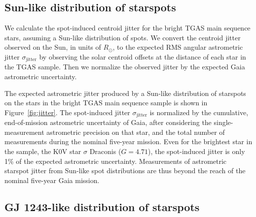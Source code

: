 \subsection{Sun-like distribution of starspots} \label{sec:sunspot_jitter}

We calculate the spot-induced centroid jitter for the bright TGAS main sequence stars, assuming a Sun-like distribution of spots. We convert the centroid jitter observed on the Sun, in units of $R_\odot$, to the expected RMS angular astrometric jitter $\sigma_{\mathrm{jitter}}$ by observing the solar centroid offsets at the distance of each star in the TGAS sample. Then we normalize the observed jitter by the expected Gaia astrometric uncertainty. 

The expected astrometric jitter produced by a Sun-like distribution of starspots on the stars in the bright TGAS main sequence sample is shown in Figure~\ref{fig:jitter}. The spot-induced jitter $\sigma_{\mathrm{jitter}}$ is normalized by the cumulative, end-of-mission astrometric uncertainty of Gaia, after considering the single-measurement astrometric precision on that star, and the total number of measurements during the nominal five-year mission. Even for the brightest star in the sample, the K0V star $\sigma$ Draconis ($G = 4.71$), the spot-induced jitter is only 1\% of the expected astrometric uncertainty. Measurements of astrometric starspot jitter from Sun-like spot distributions are thus beyond the reach of the nominal five-year Gaia mission.


\subsection{GJ 1243-like distribution of starspots} \label{sec:gj1243_jitter}


